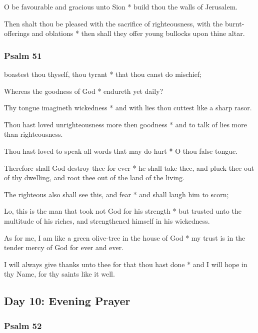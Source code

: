 O be favourable and gracious unto Sion * build thou the walls of Jerusalem.

Then shalt thou be pleased with the sacrifice of righteousness, with the burnt-offerings and oblations * then shall they offer young bullocks upon thine altar.

\subsubsection{Psalm 51}


 boastest thou thyself, thou tyrant * that thou canst do mischief;

Whereas the goodness of God * endureth yet daily?

Thy tongue imagineth wickedness * and with lies thou cuttest like a sharp rasor.

Thou hast loved unrighteousness more then goodness * and to talk of lies more than righteousness.

Thou hast loved to speak all words that may do hurt * O thou false tongue.

Therefore shall God destroy thee for ever * he shall take thee, and pluck thee out of thy dwelling, and root thee out of the land of the living.

The righteous also shall see this, and fear * and shall laugh him to scorn;

Lo, this is the man that took not God for his strength * but trusted unto the multitude of his riches, and strengthened himself in his wickedness.

As for me, I am like a green olive-tree in the house of God * my trust is in the tender mercy of God for ever and ever.

I will always give thanks unto thee for that thou hast done * and I will hope in thy Name, for thy saints like it well.

\subsection{Day 10: Evening Prayer}

\subsubsection{Psalm 52}


